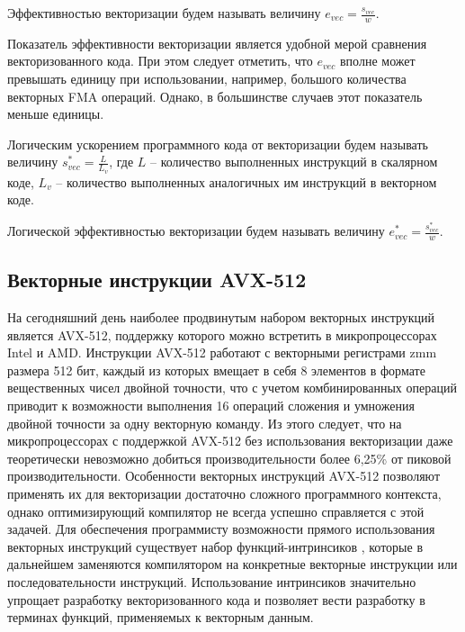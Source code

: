 \begin{definition}
Эффективностью векторизации будем называть величину $e_{vec} = \frac{s_{vec}}{w}$.
\end{definition}

Показатель эффективности векторизации является удобной мерой сравнения векторизованного кода.
При этом следует отметить, что $e_{vec}$ вполне может превышать единицу при использовании, например, большого количества векторных FMA операций.
Однако, в большинстве случаев этот показатель меньше единицы.

\begin{definition}
Логическим ускорением программного кода от векторизации будем называть величину $s_{vec}^{*} = \frac{L}{L_v}$, где $L$ -- количество выполненных инструкций в скалярном коде, $L_v$ -- количество выполненных аналогичных им инструкций в векторном коде.
\end{definition}

\begin{definition}
Логической эффективностью векторизации будем называть величину $e_{vec}^{*} = \frac{s_{vec}^{*}}{w}$.
\end{definition}


\subsection{Векторные инструкции AVX-512}

На сегодняшний день наиболее продвинутым набором векторных инструкций является AVX-512, поддержку которого можно встретить в микропроцессорах Intel и AMD.
Инструкции AVX-512 работают с векторными регистрами zmm размера 512 бит, каждый из которых вмещает в себя 8 элементов в формате вещественных чисел двойной точности, что с учетом комбинированных операций приводит к возможности выполнения 16 операций сложения и умножения двойной точности за одну векторную команду.
Из этого следует, что на микропроцессорах с поддержкой AVX-512 без использования векторизации даже теоретически невозможно добиться производительности более 6,25\% от пиковой производительности.
Особенности векторных инструкций AVX-512 позволяют применять их для векторизации достаточно сложного программного контекста, однако оптимизирующий компилятор не всегда успешно справляется с этой задачей.
Для обеспечения программисту возможности прямого использования векторных инструкций существует набор функций-интринсиков \cite{IntelIntrinsicsGuide}, которые в дальнейшем заменяются компилятором на конкретные векторные инструкции или последовательности инструкций.
Использование интринсиков значительно упрощает разработку векторизованного кода и позволяет вести разработку в терминах функций, применяемых к векторным данным.

